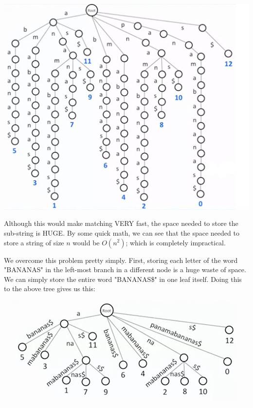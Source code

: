 \documentclass{article}
\theoremstyle{definition}
\theoremstyle{example}
\begin{document}
\vspace{3mm}
\begin{center}
    \includegraphics[scale = 0.75]{Final_Trie.jpg}
\end{center}
\vspace{3mm}
\newpage
Although this would make matching VERY fast, the space needed to store the sub-string is HUGE. By some quick math, we can see that the space needed to store a string of size $n$ would be $O(n^2)$; which is completely impractical.\par
\vspace{4mm}
We overcome this problem pretty simply. First, storing each letter of the word "BANANAS" in the left-most branch in a different node is a huge waste of space. We can simply store the entire word "BANANAS\$" in one leaf itself. Doing this to the above tree gives us this:\par
\vspace{2mm}
\begin{center}
    \includegraphics[scale = 0.77]{comp.jpg}
\end{center}
\end{document}
